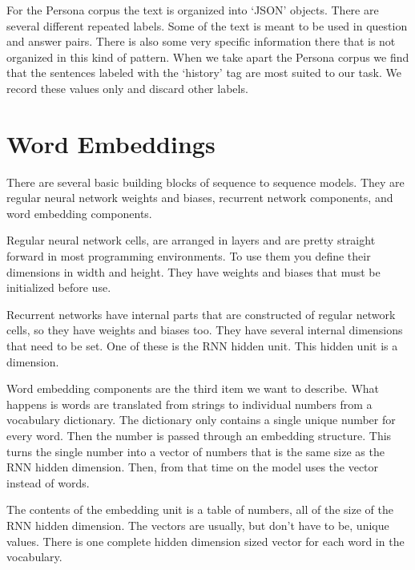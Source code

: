 For the Persona corpus the text is organized into `JSON' objects. There
are several different repeated labels. Some of the text is meant to be used in question and answer pairs. There is also some very specific information there that is not
organized in this kind of pattern. When we take apart the Persona corpus
we find that the sentences labeled with the `history' tag are most suited to our task.
We record these values only and discard other labels.



\section{Word Embeddings}

There are several basic building blocks of sequence to sequence models. They are regular neural network weights and biases, recurrent network components, and word embedding components.

Regular neural network cells, are arranged in layers and are pretty straight forward in most programming environments. To use them you define their dimensions in width and height. They have weights and biases that must be initialized before use.

Recurrent networks have internal parts that are constructed of regular network cells, so they have weights and biases too. They have several internal dimensions that need to be set. One of these is the RNN hidden unit. This hidden unit is a dimension.

Word embedding components are the third item we want to describe. What happens is words are translated from strings to individual numbers from a vocabulary dictionary. The dictionary only contains a single unique number for every word. Then the number is passed through an embedding structure. This turns the single number into a vector of numbers that is the same size as the RNN hidden dimension. Then, from that time on the model uses the vector instead of words.

The contents of the embedding unit is a table of numbers, all of the size of the RNN hidden dimension. The vectors are usually, but don\textquoteright t have to be, unique values. There is one complete hidden dimension sized vector for each word in the vocabulary. 

